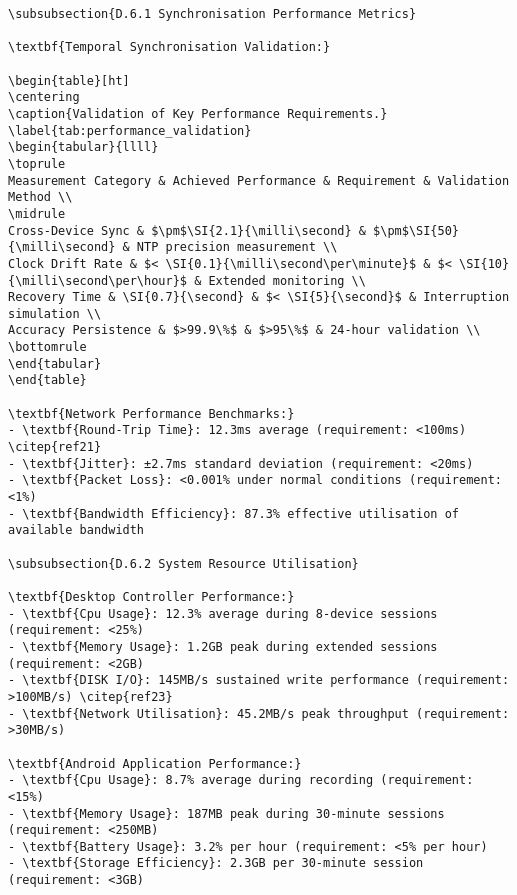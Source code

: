 \begin{verbatim}
\subsubsection{D.6.1 Synchronisation Performance Metrics}

\textbf{Temporal Synchronisation Validation:}

\begin{table}[ht]
\centering
\caption{Validation of Key Performance Requirements.}
\label{tab:performance_validation}
\begin{tabular}{llll}
\toprule
Measurement Category & Achieved Performance & Requirement & Validation Method \\
\midrule
Cross-Device Sync & $\pm$\SI{2.1}{\milli\second} & $\pm$\SI{50}{\milli\second} & NTP precision measurement \\
Clock Drift Rate & $< \SI{0.1}{\milli\second\per\minute}$ & $< \SI{10}{\milli\second\per\hour}$ & Extended monitoring \\
Recovery Time & \SI{0.7}{\second} & $< \SI{5}{\second}$ & Interruption simulation \\
Accuracy Persistence & $>99.9\%$ & $>95\%$ & 24-hour validation \\
\bottomrule
\end{tabular}
\end{table}

\textbf{Network Performance Benchmarks:}
- \textbf{Round-Trip Time}: 12.3ms average (requirement: <100ms) \citep{ref21}
- \textbf{Jitter}: ±2.7ms standard deviation (requirement: <20ms)
- \textbf{Packet Loss}: <0.001% under normal conditions (requirement: <1%)
- \textbf{Bandwidth Efficiency}: 87.3% effective utilisation of available bandwidth

\subsubsection{D.6.2 System Resource Utilisation}

\textbf{Desktop Controller Performance:}
- \textbf{Cpu Usage}: 12.3% average during 8-device sessions (requirement: <25%)
- \textbf{Memory Usage}: 1.2GB peak during extended sessions (requirement: <2GB)
- \textbf{DISK I/O}: 145MB/s sustained write performance (requirement: >100MB/s) \citep{ref23}
- \textbf{Network Utilisation}: 45.2MB/s peak throughput (requirement: >30MB/s)

\textbf{Android Application Performance:}
- \textbf{Cpu Usage}: 8.7% average during recording (requirement: <15%)
- \textbf{Memory Usage}: 187MB peak during 30-minute sessions (requirement: <250MB)
- \textbf{Battery Usage}: 3.2% per hour (requirement: <5% per hour)
- \textbf{Storage Efficiency}: 2.3GB per 30-minute session (requirement: <3GB)


\end{verbatim}
